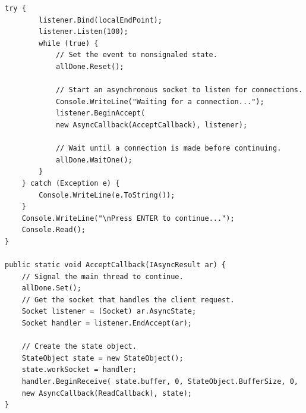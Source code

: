 \documentclass[a4paper]{report}
\begin{document}
\begin{Verbatim}[tabsize=4]
	try {
		listener.Bind(localEndPoint);
		listener.Listen(100);
		while (true) {
			// Set the event to nonsignaled state.
			allDone.Reset();
			
			// Start an asynchronous socket to listen for connections.
			Console.WriteLine("Waiting for a connection...");
			listener.BeginAccept( 
			new AsyncCallback(AcceptCallback), listener);
			
			// Wait until a connection is made before continuing.
			allDone.WaitOne();
		}
	} catch (Exception e) {
		Console.WriteLine(e.ToString());
	}
	Console.WriteLine("\nPress ENTER to continue...");
	Console.Read();
}

public static void AcceptCallback(IAsyncResult ar) {
	// Signal the main thread to continue.
	allDone.Set();    
	// Get the socket that handles the client request.
	Socket listener = (Socket) ar.AsyncState;
	Socket handler = listener.EndAccept(ar);
	
	// Create the state object.
	StateObject state = new StateObject();
	state.workSocket = handler;
	handler.BeginReceive( state.buffer, 0, StateObject.BufferSize, 0,
	new AsyncCallback(ReadCallback), state);
}
\end{Verbatim}
\end{document}
